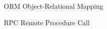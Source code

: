 
\begin{abbreviations}
\item [ORM] Object-Relational Mapping
\item [RPC] Remote Procedure Call

\end{abbreviations}